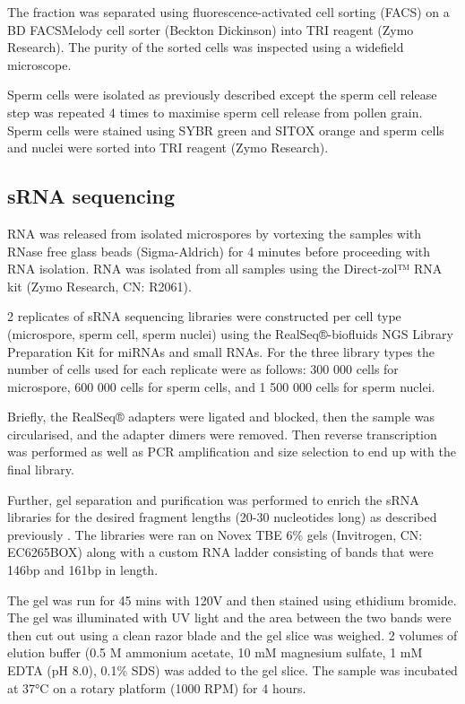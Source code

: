 The fraction was separated using fluorescence-activated cell sorting (FACS) on a BD FACSMelody cell sorter (Beckton Dickinson) into TRI reagent (Zymo Research). The purity of the sorted cells was inspected using a widefield microscope.

Sperm cells were isolated as previously described \cite{RN140,RN141} except the sperm cell release step was repeated 4 times to maximise sperm cell release from pollen grain. Sperm cells were stained using SYBR green and SITOX orange and sperm cells and nuclei were sorted into TRI reagent (Zymo Research).

\subsection{sRNA sequencing}

RNA was released from isolated microspores by vortexing the samples with RNase free glass beads (Sigma-Aldrich) for 4 minutes before proceeding with RNA isolation. RNA was isolated from all samples using the Direct-zol™ RNA kit (Zymo Research, CN: R2061).

2 replicates of sRNA sequencing libraries were constructed per cell type (microspore, sperm cell, sperm nuclei) using the RealSeq®-biofluids NGS Library Preparation Kit for miRNAs and small RNAs. For the three library types the number of cells used for each replicate were as follows: 300 000 cells for microspore, 600 000 cells for sperm cells, and 1 500 000 cells for sperm nuclei.

Briefly, the RealSeq® adapters were ligated and blocked, then the sample was circularised, and the adapter dimers were removed. Then reverse transcription was performed as well as PCR amplification and size selection to end up with the final library.

Further, gel separation  and purification was performed to enrich the sRNA libraries for the desired fragment lengths (20-30 nucleotides long) as described previously \cite{RN187}. The libraries were ran on Novex TBE 6\% gels (Invitrogen, CN: EC6265BOX) along with a custom RNA ladder consisting of bands that were 146bp and 161bp in length. 

The gel was run for 45 mins with 120V and then stained using ethidium bromide. The gel was illuminated with UV light and the area between the two bands were then cut out using a clean razor blade and the gel slice was weighed. 2 volumes of elution buffer (0.5 M ammonium acetate, 10 mM magnesium sulfate, 1 mM EDTA (pH 8.0), 0.1\% SDS) was added to the gel slice. The sample was incubated at 37°C on a rotary platform (1000 RPM) for 4 hours. 

